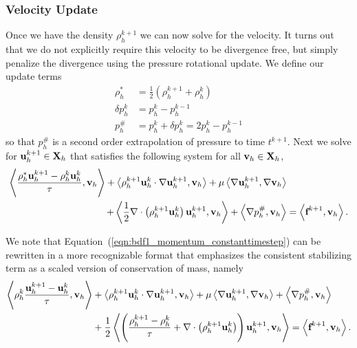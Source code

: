 \documentclass[letterpaper]{erdc}
\begin{document}
\subsubsection{Velocity Update}
Once we have the density $\rho_h^{k+1}$ we can now solve for the velocity.  It turns out that we do not explicitly require this velocity to be divergence free, but simply penalize the divergence using the pressure rotational update.  We define our update terms
\begin{align*}
  \rho_h^{*} &= \frac{1}{2}\left( \rho_h^{k+1} + \rho_h^{k} \right)\\
  \delta p_h^{k} &= p_h^{k} - p_h^{k-1}\\
    p_h^{\#} &= p_h^{k} + \delta p_h^{k} = 2p_h^{k} - p_h^{k-1}
\end{align*}
so that $p_h^{\#}$ is a second order extrapolation of pressure to time $t^{k+1}$.  Next we  solve for $\textbf{u}_h^{k+1}\in\textbf{X}_h$ that satisfies the following system for all $\textbf{v}_h\in\textbf{X}_h$,
\begin{equation}\label{eqn:bdf1_momentum_constanttimestep}
  \begin{split}
\left\langle  \frac{\rho_h^{*}\textbf{u}_h^{k+1}-\rho_h^{k}\textbf{u}_h^{k} }{\tau} , \textbf{v}_h \right\rangle + \left\langle  \rho_h^{k+1}\textbf{u}_h^{k}\cdot\nabla\textbf{u}_h^{k+1} , \textbf{v}_h \right\rangle+ \mu\left\langle  \nabla \textbf{u}_h^{k+1} , \nabla\textbf{v}_h \right\rangle&\\
 + \left\langle  \frac{1}{2}\nabla\cdot\left(\rho_h^{k+1}\textbf{u}_h^{k}\right)\textbf{u}_h^{k+1} , \textbf{v}_h \right\rangle +\left\langle \nabla p_h^{\#}, \textbf{v}_h \right\rangle &= \left\langle \textbf{f}^{k+1}, \textbf{v}_h \right\rangle.
\end{split}
\end{equation}

We note that Equation~(\ref{eqn:bdf1_momentum_constanttimestep}) can be rewritten in a more recognizable format that emphasizes the consistent stabilizing term as a scaled version of conservation of mass, namely
\begin{equation}
  \begin{split}
\left\langle \rho_h^{k} \frac{\textbf{u}_h^{k+1}-\textbf{u}_h^{k} }{\tau} , \textbf{v}_h \right\rangle &+ \left\langle  \rho_h^{k+1}\textbf{u}_h^{k}\cdot\nabla\textbf{u}_h^{k+1} , \textbf{v}_h \right\rangle + \mu\left\langle  \nabla \textbf{u}_h^{k+1} , \nabla\textbf{v}_h \right\rangle+\left\langle \nabla p_h^{\#}, \textbf{v}_h \right\rangle\\
 &+ \frac{1}{2}\left\langle  \left(\frac{\rho_h^{k+1} - \rho_h^{k}}{\tau} + \nabla\cdot\left(\rho_h^{k+1}\textbf{u}_h^{k}\right)  \right )\textbf{u}_h^{k+1} , \textbf{v}_h \right\rangle = \left\langle \textbf{f}^{k+1}, \textbf{v}_h \right\rangle.
\end{split}
\end{equation}


%
\end{document}
